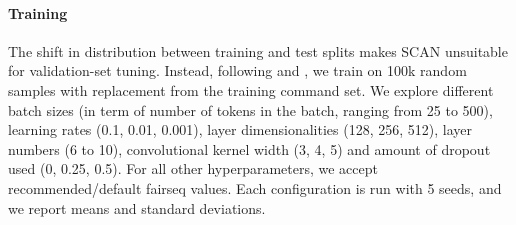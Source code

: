 \paragraph{Training} The shift in distribution between training and
test splits makes SCAN unsuitable for validation-set tuning. Instead,
following  and , we
train on 100k random samples with replacement from the
training command set. We explore different batch sizes (in term of number of tokens in the
batch, ranging from 25 to 500), learning rates (0.1, 0.01, 0.001), layer dimensionalities
(128, 256, 512), layer numbers (6 to 10), convolutional
kernel width (3, 4, 5) and amount of dropout used (0, 0.25, 0.5).
For all other hyperparameters, we accept recommended/default fairseq values. Each configuration is run with 5
seeds, and we report means and standard deviations.





